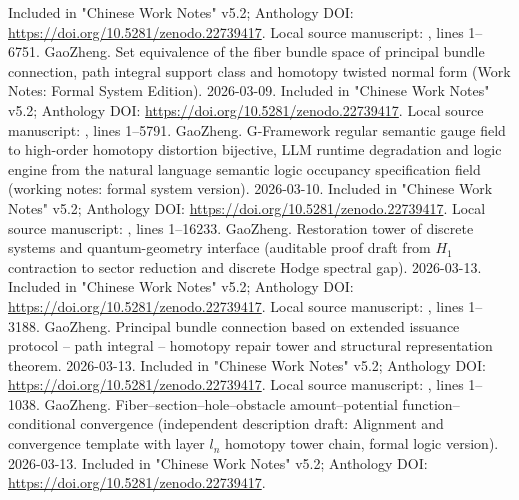 \documentclass[11pt,a4paper]{article}
\theoremstyle{plain}
\theoremstyle{definition}
\theoremstyle{remark}
\begin{document}
\begin{CJK*}
\begin{thebibliography}
Included in "Chinese Work Notes" v5.2; Anthology DOI: \url{https://doi.org/10.5281/zenodo.22739417}.\newblock
Local source manuscript: , lines 1--6751. 
GaoZheng. Set equivalence of the fiber bundle space of principal bundle connection, path integral support class and homotopy twisted normal form (Work Notes: Formal System Edition). 2026-03-09.\newblock
Included in "Chinese Work Notes" v5.2; Anthology DOI: \url{https://doi.org/10.5281/zenodo.22739417}.\newblock
Local source manuscript: , lines 1--5791.  GaoZheng. G-Framework regular semantic gauge field to high-order homotopy distortion bijective, LLM runtime degradation and logic engine from the natural language semantic logic occupancy specification field (working notes: formal system version). 2026-03-10.\newblock
Included in "Chinese Work Notes" v5.2; Anthology DOI: \url{https://doi.org/10.5281/zenodo.22739417}.\newblock
Local source manuscript: , lines 1--16233.  GaoZheng. Restoration tower of discrete systems and quantum-geometry interface (auditable proof draft from $H_1$ contraction to sector reduction and discrete Hodge spectral gap). 2026-03-13.\newblock
Included in "Chinese Work Notes" v5.2; Anthology DOI: \url{https://doi.org/10.5281/zenodo.22739417}.\newblock
Local source manuscript: , lines 1--3188.  GaoZheng. Principal bundle connection based on extended issuance protocol -- path integral -- homotopy repair tower and structural representation theorem. 2026-03-13.\newblock
Included in "Chinese Work Notes" v5.2; Anthology DOI: \url{https://doi.org/10.5281/zenodo.22739417}.\newblock
Local source manuscript: , lines 1--1038.  GaoZheng. Fiber--section--hole--obstacle amount--potential function--conditional convergence (independent description draft: Alignment and convergence template with layer $l_n$ homotopy tower chain, formal logic version). 2026-03-13.\newblock
Included in "Chinese Work Notes" v5.2; Anthology DOI: \url{https://doi.org/10.5281/zenodo.22739417}.\newblock

\end{thebibliography}
\end{CJK*}
\end{document}
